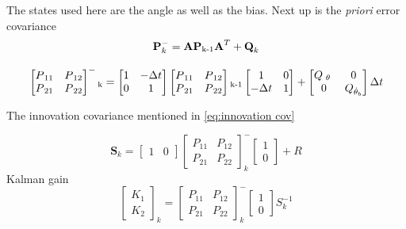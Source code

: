 \documentclass[a4paper,11pt]{kth-mag}
\begin{document}
The states used here  are the angle as well as the bias. Next up is the \textit{priori} error covariance
\begin{equation}
\textbf{P}^-_k = \textbf{A} \textbf{P}\textsubscript{k-1}\textbf{A}^T + \textbf{Q}_k
\end{equation}

\begin{equation}
\begin{bmatrix}
P\textsubscript{11} & P\textsubscript{12} \\
P\textsubscript{21} & P\textsubscript{22}
\end{bmatrix}^-\textsubscript{k} =
\begin{bmatrix}
1  & -\Delta t \\
0   & 1
\end{bmatrix}
\begin{bmatrix}
P\textsubscript{11} & P\textsubscript{12} \\
P\textsubscript{21} & P\textsubscript{22}
\end{bmatrix}\textsubscript{k-1}
\begin{bmatrix}
1 & 0 \\
-\Delta t & 1
\end{bmatrix}
+
\begin{bmatrix}
Q\textsubscript{ $\theta$ } & 0 \\
0 & Q\textsubscript{$\dot{\theta}_b$}
\end{bmatrix}
\Delta t
\end{equation}

The innovation covariance mentioned in \ref{eq:innovation cov}

\begin{equation} 
\textbf{S}_k=
\begin{bmatrix}
1 & 0
\end{bmatrix}
\begin{bmatrix}
P_{11} & P_{12} \\
P_{21} & P_{22} 
\end{bmatrix}^- _k
\begin{bmatrix}
1 \\ 0
\end{bmatrix}
+
R
\end{equation}
Kalman gain
\begin{equation}
\begin{bmatrix}
K_1 \\ K_2
\end{bmatrix}_k
=
\begin{bmatrix}
P_{11} & P_{12} \\
P_{21} & P_{22}
\end{bmatrix}^-_k
\begin{bmatrix}
1 \\ 0
\end{bmatrix}
S^{-1}_k
\end{equation}
\end{document}
